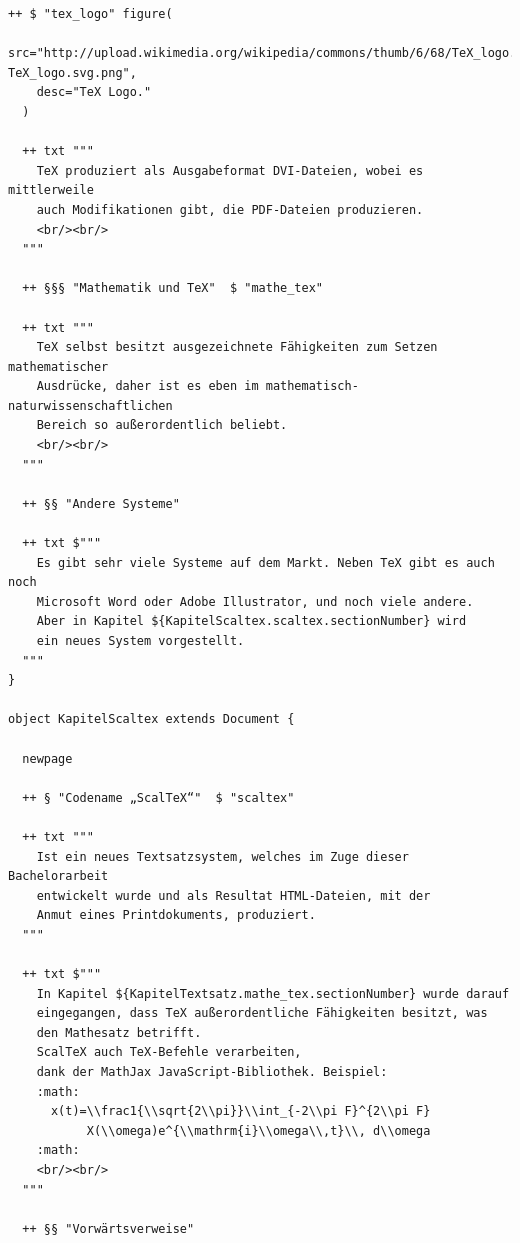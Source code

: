\begin{lstlisting}[label=dsl-skript,caption=Ausführliches Scala DSL Dokument-Skript.]
  ++ $ "tex_logo" figure(
    src="http://upload.wikimedia.org/wikipedia/commons/thumb/6/68/TeX_logo.svg/500px-TeX_logo.svg.png",
    desc="TeX Logo."
  )

  ++ txt """
    TeX produziert als Ausgabeformat DVI-Dateien, wobei es mittlerweile
    auch Modifikationen gibt, die PDF-Dateien produzieren.
    <br/><br/>
  """

  ++ §§§ "Mathematik und TeX"  $ "mathe_tex"

  ++ txt """
    TeX selbst besitzt ausgezeichnete Fähigkeiten zum Setzen mathematischer
    Ausdrücke, daher ist es eben im mathematisch-naturwissenschaftlichen
    Bereich so außerordentlich beliebt.
    <br/><br/>
  """

  ++ §§ "Andere Systeme"

  ++ txt $"""
    Es gibt sehr viele Systeme auf dem Markt. Neben TeX gibt es auch noch
    Microsoft Word oder Adobe Illustrator, und noch viele andere.
    Aber in Kapitel ${KapitelScaltex.scaltex.sectionNumber} wird
    ein neues System vorgestellt.
  """
}

object KapitelScaltex extends Document {

  newpage

  ++ § "Codename „ScalTeX“"  $ "scaltex"

  ++ txt """
    Ist ein neues Textsatzsystem, welches im Zuge dieser Bachelorarbeit
    entwickelt wurde und als Resultat HTML-Dateien, mit der
    Anmut eines Printdokuments, produziert.
  """

  ++ txt $"""
    In Kapitel ${KapitelTextsatz.mathe_tex.sectionNumber} wurde darauf
    eingegangen, dass TeX außerordentliche Fähigkeiten besitzt, was
    den Mathesatz betrifft.
    ScalTeX auch TeX-Befehle verarbeiten,
    dank der MathJax JavaScript-Bibliothek. Beispiel:
    :math:
      x(t)=\\frac1{\\sqrt{2\\pi}}\\int_{-2\\pi F}^{2\\pi F}
           X(\\omega)e^{\\mathrm{i}\\omega\\,t}\\, d\\omega
    :math:
    <br/><br/>
  """

  ++ §§ "Vorwärtsverweise"


\end{lstlisting}
